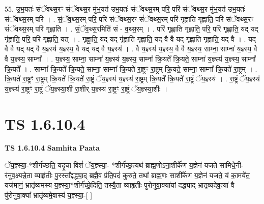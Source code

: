 \documentclass[17pt]{extarticle}
\begin{document}
55. उ॒भ॒यतः॑ संॅवथ्स॒रꣳ सं॑ॅवथ्स॒र मु॑भ॒यत॑ उभ॒यतः॑ संॅवथ्स॒रम् परि॒ परि॑ संॅवथ्स॒र मु॑भ॒यत॑ उभ॒यतः॑ संॅवथ्स॒रम् परि॑ । . सं॒ॅव॒थ्स॒रम् परि॒ परि॑ संॅवथ्स॒रꣳ सं॑ॅवथ्स॒रम् परि॑ गृह्णाति गृह्णाति॒ परि॑ संॅवथ्स॒रꣳ सं॑ॅवथ्स॒रम् परि॑ गृह्णाति । . सं॒ॅव॒थ्स॒रमिति॑ सं - व॒थ्स॒रम् । . परि॑ गृह्णाति गृह्णाति॒ परि॒ परि॑ गृह्णाति॒ यद् यद् गृ॑ह्णाति॒ परि॒ परि॑ गृह्णाति॒ यत् । . गृ॒ह्णा॒ति॒ यद् यद् गृ॑ह्णाति गृह्णाति॒ यद् वै वै यद् गृ॑ह्णाति गृह्णाति॒ यद् वै । . यद् वै वै यद् यद् वै य॒ज्ञ्स्य॑ य॒ज्ञ्स्य॒ वै यद् यद् वै य॒ज्ञ्स्य॑ । . वै य॒ज्ञ्स्य॑ य॒ज्ञ्स्य॒ वै वै य॒ज्ञ्स्य॒ साम्ना॒ साम्ना॑ य॒ज्ञ्स्य॒ वै वै य॒ज्ञ्स्य॒ साम्ना᳚ । . य॒ज्ञ्स्य॒ साम्ना॒ साम्ना॑ य॒ज्ञ्स्य॑ य॒ज्ञ्स्य॒ साम्ना᳚ क्रि॒यते᳚ क्रि॒यते॒ साम्ना॑ य॒ज्ञ्स्य॑ य॒ज्ञ्स्य॒ साम्ना᳚ क्रि॒यते᳚ । . साम्ना᳚ क्रि॒यते᳚ क्रि॒यते॒ साम्ना॒ साम्ना᳚ क्रि॒यते॑ रा॒ष्ट्रꣳ रा॒ष्ट्रम् क्रि॒यते॒ साम्ना॒ साम्ना᳚ क्रि॒यते॑ रा॒ष्ट्रम् । . क्रि॒यते॑ रा॒ष्ट्रꣳ रा॒ष्ट्रम् क्रि॒यते᳚ क्रि॒यते॑ रा॒ष्ट्रं ॅय॒ज्ञ्स्य॑ य॒ज्ञ्स्य॑ रा॒ष्ट्रम् क्रि॒यते᳚ क्रि॒यते॑ रा॒ष्ट्रं ॅय॒ज्ञ्स्य॑ । . रा॒ष्ट्रं ॅय॒ज्ञ्स्य॑ य॒ज्ञ्स्य॑ रा॒ष्ट्रꣳ रा॒ष्ट्रं ॅय॒ज्ञ्स्या॒शी रा॒शीर् य॒ज्ञ्स्य॑ रा॒ष्ट्रꣳ रा॒ष्ट्रं ॅय॒ज्ञ्स्या॒शीः । \newline
\pagebreak
{}
\section*{ TS 1.6.10.4 }

\textbf{TS 1.6.10.4 } \newline
\textbf{Samhita Paata} \newline

ॅय॒ज्ञ्स्या॒-*शीर्ग॑च्छति॒ यदृ॒चा विशं॑ ॅय॒ज्ञ्स्या॒- *शीर्ग॑च्छ॒त्यथ॑ ब्राह्म॒णो॑ऽना॒शीर्के॑ण य॒ज्ञेन॑ यजते सामिधे॒नी-र॑नुव॒क्ष्यन्ने॒ता व्याहृ॑तीः पु॒रस्ता᳚द्दद्ध्या॒द् ब्रह्मै॒व प्र॑ति॒पदं॑ कुरुते॒ तथा᳚ ब्राह्म॒णः साशी᳚र्केण य॒ज्ञेन॑ यजते॒ यं का॒मये॑त॒ यज॑मानं॒ भ्रातृ॑व्यमस्य य॒ज्ञ्स्या॒*शीर्ग॑च्छे॒दिति॒ तस्यै॒ता व्याहृ॑तीः पुरोनुवा॒क्या॑यां दद्ध्याद् भ्रातृव्यदेव॒त्या॑ वै पु॑रोनुवा॒क्या᳚ भ्रातृ॑व्यमे॒वास्य॑ य॒ज्ञ्स्या॒-[ ] \newline
\end{document}
